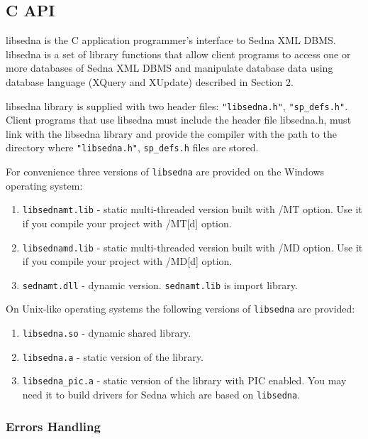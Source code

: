 \documentclass[a4paper,12pt]{article}
\begin{document}
\subsection{C API}
\label{c-api}

libsedna is the C application programmer's interface to Sedna XML DBMS. libsedna
is a set of library functions that allow client programs to access one or more
databases of Sedna XML DBMS and manipulate database data using database language
(XQuery and XUpdate) described in Section 2.

libsedna library is supplied with two header files: \verb!"libsedna.h"!,
\verb!"sp_defs.h"!. Client programs that use libsedna must include the header
file libsedna.h, must link with the libsedna library and provide the compiler
with the path to the directory where \verb!"libsedna.h"!, \verb!sp_defs.h! files
are stored.

For convenience three versions of \verb!libsedna! are provided on the Windows
operating system:

\begin{enumerate}
\item\verb!libsednamt.lib! - static multi-threaded version built with /MT
option. Use it if you compile your project with /MT[d] option.
\item\verb!libsednamd.lib! - static multi-threaded version built with /MD
option. Use it if you compile your project with /MD[d] option.
\item\verb!sednamt.dll! - dynamic version. \verb!sednamt.lib! is import library.
\end{enumerate}

On Unix-like operating systems the following versions of \verb!libsedna! are
provided:

\begin{enumerate}
\item\verb!libsedna.so! - dynamic shared library.
\item\verb!libsedna.a! - static version of the library.
\item\verb!libsedna_pic.a! - static version of the library with PIC enabled. You
may need it to build drivers for Sedna which are based on \verb!libsedna!.
\end{enumerate}


\subsubsection{Errors Handling}
\end{document}
